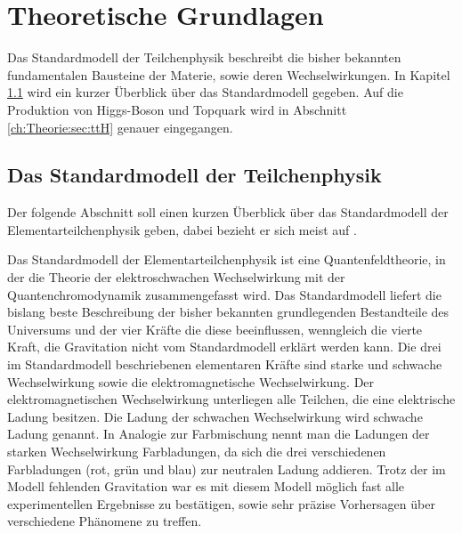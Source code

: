 \chapter{Theoretische Grundlagen}
\label{ch:Theorie}

{}

Das Standardmodell der Teilchenphysik beschreibt die bisher bekannten fundamentalen Bausteine der Materie, sowie deren Wechselwirkungen. In Kapitel \ref{ch:Theorie:sec:Standardmodell} wird ein kurzer \"Uberblick \"uber das Standardmodell gegeben. Auf die Produktion von Higgs-Boson und Topquark wird in Abschnitt \ref{ch:Theorie:sec:ttH} genauer eingegangen.\\


\section{Das Standardmodell der Teilchenphysik}
\label{ch:Theorie:sec:Standardmodell}

Der folgende Abschnitt soll einen kurzen \"Uberblick \"uber das Standardmodell der Elementarteilchenphysik geben, dabei bezieht er sich meist auf \cite{SWB-39819646X}.

Das Standardmodell der Elementarteilchenphysik ist eine Quantenfeldtheorie, in der die Theorie der elektroschwachen Wechselwirkung mit der Quantenchromodynamik zusammengefasst wird.%
Das Standardmodell liefert die bislang beste Beschreibung der bisher bekannten grundlegenden Bestandteile des Universums und der vier Kr\"afte die diese beeinflussen, wenngleich die vierte Kraft, die Gravitation nicht vom Standardmodell erkl\"art werden kann. Die drei im Standardmodell beschriebenen elementaren Kr\"afte sind starke und schwache Wechselwirkung sowie die elektromagnetische Wechselwirkung. Der elektromagnetischen Wechselwirkung unterliegen alle Teilchen, die eine elektrische Ladung besitzen. Die Ladung der schwachen Wechselwirkung wird schwache Ladung genannt. In Analogie zur Farbmischung nennt man die Ladungen der starken Wechselwirkung Farbladungen, da sich die drei verschiedenen Farbladungen (rot, gr\"un und blau) zur neutralen Ladung addieren. Trotz der im Modell fehlenden Gravitation war es mit diesem Modell m\"oglich fast alle experimentellen Ergebnisse zu best\"atigen, sowie sehr pr\"azise Vorhersagen \"uber verschiedene Ph\"anomene zu treffen.

